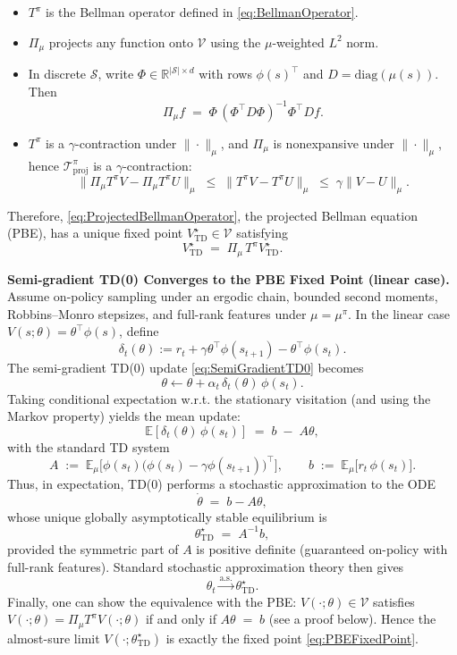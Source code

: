 \documentclass[
]{book}
\theoremstyle{definition}
\theoremstyle{definition}
\theoremstyle{definition}
\theoremstyle{definition}
\theoremstyle{remark}
\begin{document}
\begin{itemize}
\item
  \(T^\pi\) is the Bellman operator defined in \eqref{eq:BellmanOperator}.
\item
  \(\Pi_\mu\) projects any function onto \(\mathcal V\) using the \(\mu\)-weighted \(L^2\) norm.
\item
  In discrete \(\mathcal S\), write \(\Phi\in\mathbb{R}^{|\mathcal S|\times d}\) with rows \(\phi(s)^\top\) and \(D=\mathrm{diag}(\mu(s))\). Then
  \[
  \Pi_\mu f \;=\; \Phi\,(\Phi^\top D \Phi)^{-1}\Phi^\top D f.
  \]
\item
  \(T^\pi\) is a \(\gamma\)-contraction under \(\|\cdot\|_\mu\), and \(\Pi_\mu\) is nonexpansive under \(\|\cdot\|_\mu\), hence \(\mathcal{T}^\pi_{\!\text{proj}}\) is a \(\gamma\)-contraction:
  \[
  \|\Pi_\mu T^\pi V - \Pi_\mu T^\pi U\|_\mu \;\le\; \|T^\pi V - T^\pi U\|_\mu \;\le\; \gamma \|V-U\|_\mu.
  \]
\end{itemize}

Therefore, \eqref{eq:ProjectedBellmanOperator}, the projected Bellman equation (PBE), has a unique fixed point \(V_{\text{TD}}^\star\in\mathcal V\) satisfying
\begin{equation}
V_{\text{TD}}^\star \;=\; \Pi_\mu\, T^\pi V_{\text{TD}}^\star.
\label{eq:PBEFixedPoint}
\end{equation}

\textbf{Semi-gradient TD(0) Converges to the PBE Fixed Point (linear case).} Assume on-policy sampling under an ergodic chain, bounded second moments, Robbins--Monro stepsizes, and full-rank features under \(\mu = \mu^\pi\). In the linear case \(V(s;\theta)=\theta^\top\phi(s)\), define
\[
\delta_t(\theta) := r_t + \gamma \theta^\top \phi(s_{t+1}) - \theta^\top \phi(s_t).
\]
The semi-gradient TD(0) update \eqref{eq:SemiGradientTD0} becomes
\[
\theta \leftarrow \theta + \alpha_t\, \delta_t(\theta)\,\phi(s_t).
\]
Taking conditional expectation w.r.t. the stationary visitation (and using the Markov property) yields the mean update:
\[
\mathbb{E}\!\left[\delta_t(\theta)\,\phi(s_t)\right] \;=\; b \;-\; A\theta,
\]
with the standard TD system
\begin{equation}
A \;:=\; \mathbb{E}_{\mu}\!\big[\phi(s_t)\big(\phi(s_t)-\gamma \phi(s_{t+1})\big)^\top\big],
\qquad
b \;:=\; \mathbb{E}_{\mu}\!\big[r_{t}\,\phi(s_t)\big].
\label{eq:TDLinearSystem-again}
\end{equation}
Thus, in expectation, TD(0) performs a stochastic approximation to the ODE
\[
\dot\theta \;=\; b - A\theta,
\]
whose unique globally asymptotically stable equilibrium is
\[
\theta^\star_{\text{TD}} \;=\; A^{-1} b,
\]
provided the symmetric part of \(A\) is positive definite (guaranteed on-policy with full-rank features). Standard stochastic approximation theory then gives
\[
\theta_t \xrightarrow{\text{a.s.}} \theta^\star_{\text{TD}}.
\]
Finally, one can show the equivalence with the PBE: \(V(\cdot; \theta) \in\mathcal V\) satisfies \(V(\cdot; \theta)=\Pi_\mu T^\pi V(\cdot; \theta)\) if and only if \(A\theta \;=\; b\) (see a proof below).
Hence the almost-sure limit \(V(\cdot; \theta^\star_{\text{TD}})\) is exactly the fixed point \eqref{eq:PBEFixedPoint}.
\end{document}
